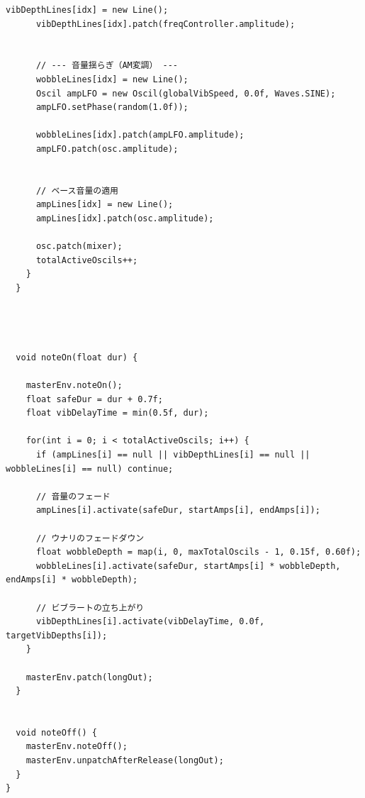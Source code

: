 \begin{lstlisting}[caption={Strings.pde}, label={lst:proc_strings}]
      vibDepthLines[idx] = new Line();
      vibDepthLines[idx].patch(freqController.amplitude);
      
      
      // --- 音量揺らぎ（AM変調） ---
      wobbleLines[idx] = new Line();
      Oscil ampLFO = new Oscil(globalVibSpeed, 0.0f, Waves.SINE);
      ampLFO.setPhase(random(1.0f));
      
      wobbleLines[idx].patch(ampLFO.amplitude);
      ampLFO.patch(osc.amplitude);
      
      
      // ベース音量の適用
      ampLines[idx] = new Line();
      ampLines[idx].patch(osc.amplitude); 
      
      osc.patch(mixer);
      totalActiveOscils++;
    }
  }
  
  
  
  
  void noteOn(float dur) {
    
    masterEnv.noteOn();
    float safeDur = dur + 0.7f; 
    float vibDelayTime = min(0.5f, dur); 
    
    for(int i = 0; i < totalActiveOscils; i++) {
      if (ampLines[i] == null || vibDepthLines[i] == null || wobbleLines[i] == null) continue; 
      
      // 音量のフェード
      ampLines[i].activate(safeDur, startAmps[i], endAmps[i]);
      
      // ウナリのフェードダウン
      float wobbleDepth = map(i, 0, maxTotalOscils - 1, 0.15f, 0.60f);
      wobbleLines[i].activate(safeDur, startAmps[i] * wobbleDepth, endAmps[i] * wobbleDepth);
      
      // ビブラートの立ち上がり
      vibDepthLines[i].activate(vibDelayTime, 0.0f, targetVibDepths[i]);
    }
    
    masterEnv.patch(longOut); 
  }
  
  
  void noteOff() {
    masterEnv.noteOff();
    masterEnv.unpatchAfterRelease(longOut); 
  }
}
\end{lstlisting}

